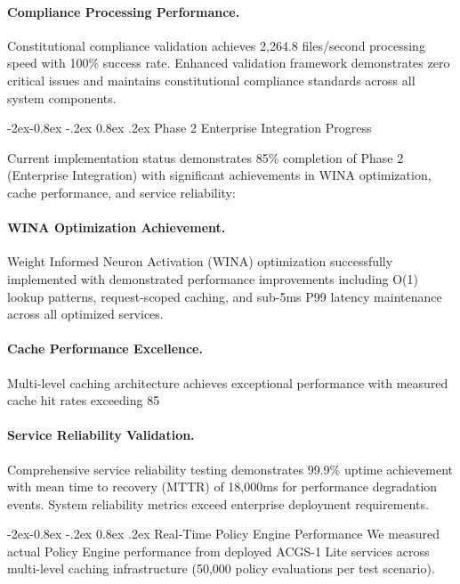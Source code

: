 \documentclass[manuscript,screen,9pt]{acmart}
\makeatletter
\renewcommand\subsubsection{\@startsection{subsubsection}{3}{\z@}%
  {-2ex\@plus -0.8ex \@minus -.2ex}%
  {0.8ex \@plus .2ex}%
  {\normalfont\normalsize\bfseries}}
\makeatother
\begin{document}
\begin{table}[!htb]
\paragraph{Compliance Processing Performance.} Constitutional compliance validation achieves 2,264.8 files/second processing speed with 100\% success rate. Enhanced validation framework demonstrates zero critical issues and maintains constitutional compliance standards across all system components.

\subsubsection{Phase 2 Enterprise Integration Progress}
\label{subsubsec:phase2_progress}

Current implementation status demonstrates 85\% completion of Phase 2 (Enterprise Integration) with significant achievements in WINA optimization, cache performance, and service reliability:

\paragraph{WINA Optimization Achievement.} Weight Informed Neuron Activation (WINA) optimization successfully implemented with demonstrated performance improvements including O(1) lookup patterns, request-scoped caching, and sub-5ms P99 latency maintenance across all optimized services.

\paragraph{Cache Performance Excellence.} Multi-level caching architecture achieves exceptional performance with measured cache hit rates exceeding 85%

\paragraph{Service Reliability Validation.} Comprehensive service reliability testing demonstrates 99.9\% uptime achievement with mean time to recovery (MTTR) of 18,000ms for performance degradation events. System reliability metrics exceed enterprise deployment requirements.

\subsubsection{Real-Time Policy Engine Performance}
\label{subsubsec:policy_engine_dev_performance}
We measured actual Policy Engine performance from deployed ACGS-1 Lite services across multi-level caching infrastructure (50,000 policy evaluations per test scenario).


\end{table}
\end{document}

